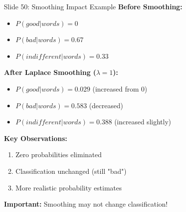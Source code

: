 \documentclass[8pt]{beamer}
\begin{document}
	\begin{frame}{Slide 50: Smoothing Impact Example}
		\fontsize{6.5}{7.5}\selectfont
		\textbf{Before Smoothing:}
		\begin{itemize}
			\item $P(good|words) = 0$
			\item $P(bad|words) = 0.67$
			\item $P(indifferent|words) = 0.33$
		\end{itemize}
		
		\vspace{0.1cm}
		\textbf{After Laplace Smoothing ($\lambda = 1$):}
		\begin{itemize}
			\item $P(good|words) = 0.029$ (increased from 0)
			\item $P(bad|words) = 0.583$ (decreased)
			\item $P(indifferent|words) = 0.388$ (increased slightly)
		\end{itemize}
		
		\vspace{0.1cm}
		\textbf{Key Observations:}
		\begin{enumerate}
			\item Zero probabilities eliminated
			\item Classification unchanged (still "bad")
			\item More realistic probability estimates
		\end{enumerate}
		
		\textcolor{myblue}{\textbf{Important:}} Smoothing may not change classification!
	\end{frame}
	
\end{document}
